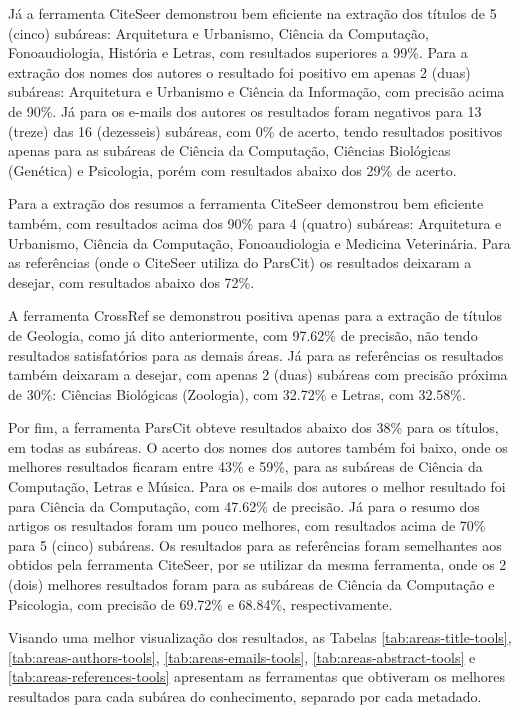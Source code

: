 Já a ferramenta CiteSeer demonstrou bem eficiente na extração dos títulos de 5 (cinco) subáreas: Arquitetura e Urbanismo, Ciência da Computação, Fonoaudiologia, História e Letras, com resultados superiores a 99\%. Para a extração dos nomes dos autores o resultado foi positivo em apenas 2 (duas) subáreas: Arquitetura e Urbanismo e Ciência da Informação, com precisão acima de 90\%. Já para os e-mails dos autores os resultados foram negativos para 13 (treze) das 16 (dezesseis) subáreas, com 0\% de acerto, tendo resultados positivos apenas para as subáreas de Ciência da Computação, Ciências Biológicas (Genética) e Psicologia, porém com resultados abaixo dos 29\% de acerto.

Para a extração dos resumos a ferramenta CiteSeer demonstrou bem eficiente também, com resultados acima dos 90\% para 4 (quatro) subáreas: Arquitetura e Urbanismo, Ciência da Computação, Fonoaudiologia e Medicina Veterinária. Para as referências (onde o CiteSeer utiliza do ParsCit) os resultados deixaram a desejar, com resultados abaixo dos 72\%.

A ferramenta CrossRef se demonstrou positiva apenas para a extração de títulos de Geologia, como já dito anteriormente, com 97.62\% de precisão, não tendo resultados satisfatórios para as demais áreas. Já para as referências os resultados também deixaram a desejar, com apenas 2 (duas) subáreas com precisão próxima de 30\%: Ciências Biológicas (Zoologia), com 32.72\% e Letras, com 32.58\%.

Por fim, a ferramenta ParsCit obteve resultados abaixo dos 38\% para os títulos, em todas as subáreas. O acerto dos nomes dos autores também foi baixo, onde os melhores resultados ficaram entre 43\% e 59\%, para as subáreas de Ciência da Computação, Letras e Música. Para os e-mails dos autores o melhor resultado foi para Ciência da Computação, com 47.62\% de precisão. Já para o resumo dos artigos os resultados foram um pouco melhores, com resultados acima de 70\% para 5 (cinco) subáreas. Os resultados para as referências foram semelhantes aos obtidos pela ferramenta CiteSeer, por se utilizar da mesma ferramenta, onde os 2 (dois) melhores resultados foram para as subáreas de Ciência da Computação e Psicologia, com precisão de 69.72\% e 68.84\%, respectivamente.

Visando uma melhor visualização dos resultados, as Tabelas \ref{tab:areas-title-tools}, \ref{tab:areas-authors-tools}, \ref{tab:areas-emails-tools}, \ref{tab:areas-abstract-tools} e \ref{tab:areas-references-tools} apresentam as ferramentas que obtiveram os melhores resultados para cada subárea do conhecimento, separado por cada metadado. 

